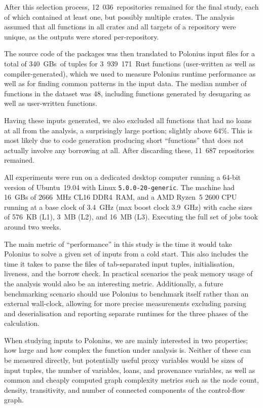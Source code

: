 \documentclass[11pt,a4paper,twoside,openany]{report}
\begin{document}
After this selection process, 12~036~repositories remained for the final study,
each of which contained at least one, but possibly multiple crates. The analysis
assumed that all functions in all crates and all targets of a repository were
unique, as the outputs were stored per-repository.

The source code of the packages was then translated to Polonius input files for
a total of 340~GBs~of tuples for 3~939~171~Rust functions (user-written as well
as compiler-generated), which we used to measure Polonius runtime performance as
well as for finding common patterns in the input data. The median number of
functions in the dataset was 48, including functions generated by desugaring as
well as user-written functions.

Having these inputs generated, we also excluded all functions that had no loans
at all from the analysis, a surprisingly large portion; slightly above 64\%.
This is most likely due to code generation producing short ``functions'' that
does not actually involve any borrowing at all. After discarding these, 11~687
repositories remained.

All experiments were run on a dedicated desktop computer running a 64-bit
version of Ubuntu~19.04 with Linux \texttt{5.0.0-20-generic}. The machine had
16~GBs of 2666~MHz CL16 DDR4~RAM, and a AMD Ryzen~5 2600 CPU running at a base
clock of 3.4~GHz (max boost clock 3.9~GHz) with cache sizes of 576~KB (L1), 3~MB
(L2), and 16~MB (L3). Executing the full set of jobs took around two weeks.

The main metric of ``performance'' in this study is the time it would take
Polonius to solve a given set of inputs from a cold start. This also includes
the time it takes to parse the files of tab-separated input tuples,
initialisation, liveness, and the borrow check. In practical scenarios the peak
memory usage of the analysis would also be an interesting metric. Additionally,
a future benchmarking scenario should use Polonius to benchmark itself rather
than an external wall-clock, allowing for more precise measurements excluding
parsing and deserialisation and reporting separate runtimes for the three
phases of the calculation.

When studying inputs to Polonius, we are mainly interested in two properties;
how large and how complex the function under analysis is. Neither of these can
be measured directly, but potentially useful proxy variables would be sizes of
input tuples, the number of variables, loans, and provenance variables, as well
as common and cheaply computed graph complexity metrics such as the node count,
density, transitivity, and number of connected components of the control-flow
graph.
\end{document}
